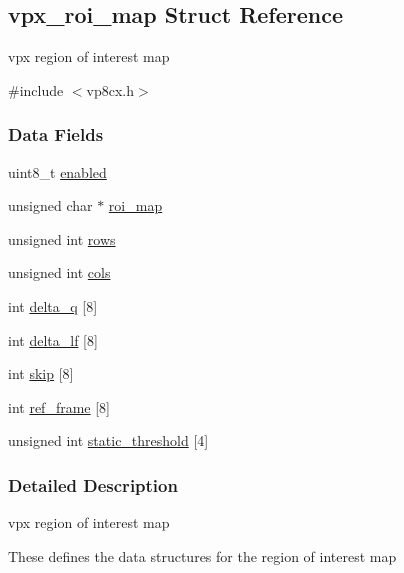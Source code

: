 \hypertarget{structvpx__roi__map}{}\subsection{vpx\+\_\+roi\+\_\+map Struct Reference}
\label{structvpx__roi__map}


vpx region of interest map  




{\ttfamily \#include $<$vp8cx.\+h$>$}

\subsubsection*{Data Fields}
\begin{DoxyCompactItemize}
\item 
uint8\+\_\+t \hyperlink{structvpx__roi__map_a2173c817469ff1e6adcd099fc3f0a164}{enabled}
\item 
unsigned char $\ast$ \hyperlink{structvpx__roi__map_aba69e211b81d622977ba07ac47b61075}{roi\+\_\+map}
\item 
unsigned int \hyperlink{structvpx__roi__map_a3fdcecd472553d08a99ced02cda5c9a6}{rows}
\item 
unsigned int \hyperlink{structvpx__roi__map_a5458459aaf16b14b86fb0adef32757c8}{cols}
\item 
int \hyperlink{structvpx__roi__map_aa41b78c77cb7f2f24ad5b336c40cdf3c}{delta\+\_\+q} \mbox{[}8\mbox{]}
\item 
int \hyperlink{structvpx__roi__map_aca3e926d9612ac6530092f7cfb0dc34c}{delta\+\_\+lf} \mbox{[}8\mbox{]}
\item 
int \hyperlink{structvpx__roi__map_a2547af0f5b4f9c42cb5fb902803245d9}{skip} \mbox{[}8\mbox{]}
\item 
int \hyperlink{structvpx__roi__map_a570cce9ea40de31cce7a070e11cb5678}{ref\+\_\+frame} \mbox{[}8\mbox{]}
\item 
unsigned int \hyperlink{structvpx__roi__map_a3354ff458e229361b53a0b2d1bf68cfb}{static\+\_\+threshold} \mbox{[}4\mbox{]}
\end{DoxyCompactItemize}


\subsubsection{Detailed Description}
vpx region of interest map 

These defines the data structures for the region of interest map 

